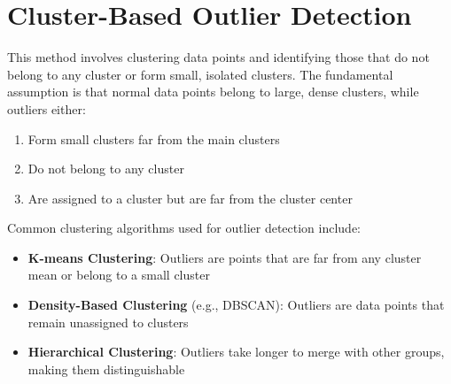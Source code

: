 \documentclass[
  letterpaper,
  DIV=11,
  numbers=noendperiod]{scrreprt}
\providecommand{\tightlist}{%
  \setlength{\itemsep}{0pt}\setlength{\parskip}{0pt}}\usepackage{longtable,booktabs,array}
\begin{document}
\section{Cluster-Based Outlier
Detection}\label{cluster-based-outlier-detection}

This method involves clustering data points and identifying those that
do not belong to any cluster or form small, isolated clusters. The
fundamental assumption is that normal data points belong to large, dense
clusters, while outliers either:

\begin{enumerate}
\def\labelenumi{\arabic{enumi}.}
\tightlist
\item
  Form small clusters far from the main clusters
\item
  Do not belong to any cluster
\item
  Are assigned to a cluster but are far from the cluster center
\end{enumerate}

Common clustering algorithms used for outlier detection include:

\begin{itemize}
\tightlist
\item
  \textbf{K-means Clustering}: Outliers are points that are far from any
  cluster mean or belong to a small cluster
\item
  \textbf{Density-Based Clustering} (e.g., DBSCAN): Outliers are data
  points that remain unassigned to clusters
\item
  \textbf{Hierarchical Clustering}: Outliers take longer to merge with
  other groups, making them distinguishable
\end{itemize}
\end{document}
